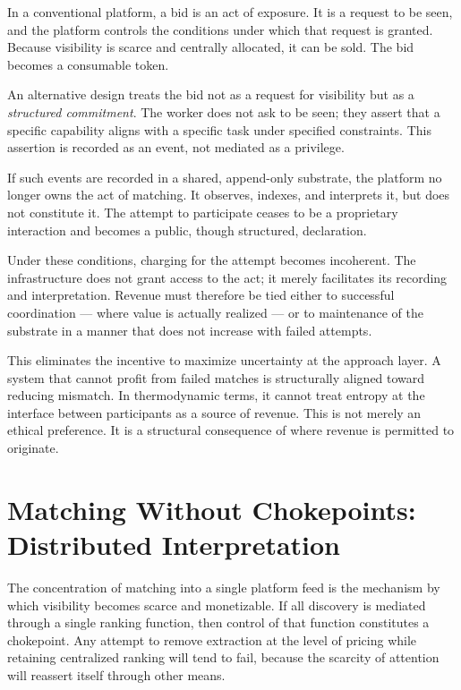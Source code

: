 \documentclass[12pt, a4paper]{article}
\begin{document}
In a conventional platform, a bid is an act of exposure. It is a request to be
seen, and the platform controls the conditions under which that request is
granted. Because visibility is scarce and centrally allocated, it can be sold.
The bid becomes a consumable token.

An alternative design treats the bid not as a request for visibility but as a
\emph{structured commitment}. The worker does not ask to be seen; they assert
that a specific capability aligns with a specific task under specified
constraints. This assertion is recorded as an event, not mediated as a
privilege.

If such events are recorded in a shared, append-only substrate, the platform no
longer owns the act of matching. It observes, indexes, and interprets it, but
does not constitute it. The attempt to participate ceases to be a proprietary
interaction and becomes a public, though structured, declaration.

Under these conditions, charging for the attempt becomes incoherent. The
infrastructure does not grant access to the act; it merely facilitates its
recording and interpretation. Revenue must therefore be tied either to
successful coordination --- where value is actually realized --- or to
maintenance of the substrate in a manner that does not increase with failed
attempts.

This eliminates the incentive to maximize uncertainty at the approach layer.
A system that cannot profit from failed matches is structurally aligned toward
reducing mismatch. In thermodynamic terms, it cannot treat entropy at the
interface between participants as a source of revenue. This is not merely
an ethical preference. It is a structural consequence of where revenue is
permitted to originate.

\section{Matching Without Chokepoints: Distributed Interpretation}

The concentration of matching into a single platform feed is the mechanism by
which visibility becomes scarce and monetizable. If all discovery is mediated
through a single ranking function, then control of that function constitutes a
chokepoint. Any attempt to remove extraction at the level of pricing while
retaining centralized ranking will tend to fail, because the scarcity of
attention will reassert itself through other means.
\end{document}
